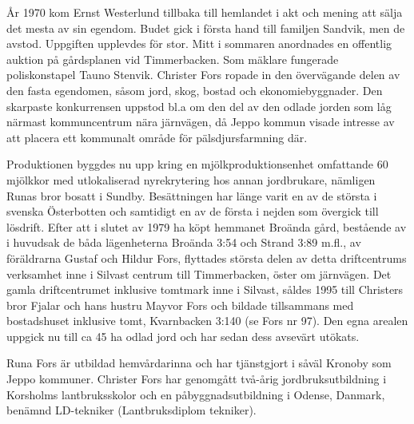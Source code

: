 År 1970 kom Ernst Westerlund tillbaka till hemlandet i akt och  mening att sälja det mesta av sin egendom. Budet gick i första hand till familjen Sandvik, men de avstod. Uppgiften upplevdes för stor. Mitt i sommaren anordnades en offentlig auktion på gårdsplanen vid Timmerbacken. Som mäklare fungerade poliskonstapel Tauno Stenvik. Christer Fors ropade in den övervägande delen av den fasta egendomen, såsom jord, skog, bostad och ekonomiebyggnader. Den skarpaste konkurrensen uppstod bl.a om den del av den odlade jorden som låg närmast kommuncentrum nära järnvägen, då Jeppo kommun visade intresse av att placera ett kommunalt område för  pälsdjursfarmning där.

Produktionen byggdes nu upp kring en mjölkproduktionsenhet omfattande 60 mjölkkor med utlokaliserad nyrekrytering hos annan jordbrukare, nämligen Runas bror bosatt i Sundby. Besättningen har länge varit en av de största i svenska Österbotten och samtidigt en av de första i nejden som övergick till lösdrift. Efter att i slutet av 1979 ha köpt hemmanet Broända gård, bestående av i huvudsak de båda lägenheterna Broända 3:54 och Strand 3:89 m.fl., av föräldrarna Gustaf och Hildur Fors, flyttades största  delen av detta driftcentrums verksamhet inne i Silvast centrum till Timmerbacken, öster om järnvägen. Det gamla driftcentrumet inklusive tomtmark inne i Silvast, såldes 1995 till Christers bror Fjalar och hans hustru Mayvor Fors och bildade tillsammans med bostadshuset inklusive tomt, Kvarnbacken 3:140 (se Fors  nr 97). Den egna arealen uppgick nu till ca 45 ha odlad jord och har sedan dess avsevärt utökats.

Runa Fors är utbildad hemvårdarinna och har tjänstgjort i såväl Kronoby som Jeppo kommuner. Christer Fors har genomgått två-årig jordbruksutbildning i Korsholms lantbruksskolor och en påbyggnadsutbildning i Odense, Danmark, benämnd LD-tekniker (Lantbruksdiplom tekniker).

